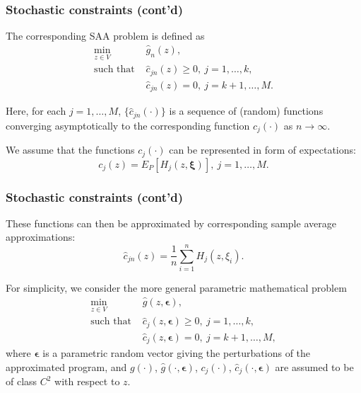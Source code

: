 \documentclass{beamer}
\def\bepsilon{\boldsymbol\epsilon}
\begin{document}
\begin{frame}
\frametitle{Stochastic constraints (cont'd)}

The corresponding SAA problem is defined as
\begin{align*}
\min_{z \in V}\ & \hat{g}_n(z),\\
\text{such that } & \hat{c}_{jn}(z) \geq 0,\ j = 1,\ldots,k,\\
& \hat{c}_{jn}(z) = 0,\ j = k+1,\ldots, M.
\end{align*}

\mbox{}

Here, for each $j = 1,\ldots,M$, $\lbrace \hat{c}_{jn}(\cdot) \rbrace$ is a sequence of (random) functions converging asymptotically to the corresponding function $c_j(\cdot)$ as $n \rightarrow \infty$.

\mbox{}

We assume that the functions $c_j(\cdot)$ can be represented in form of expectations:
\[
c_j(z) = E_P[H_j(z,\boldsymbol{\xi})],\ j = 1,\ldots,M.
\]

\end{frame}

\begin{frame}
\frametitle{Stochastic constraints (cont'd)}

These functions can then be approximated by corresponding sample average approximations:
\[
\hat{c}_{jn}(z) = \frac{1}{n} \sum_{i = 1}^n H_j(z,\xi_i).
\]

\mbox{}

For simplicity, we consider the more general parametric mathematical problem
\begin{align*}
\min_{z \in V}\ & \hat{g}(z, \bepsilon),\\
\text{such that } & \hat{c}_j(z, \bepsilon) \geq 0,\ j
= 1,\ldots,k,\\
& \hat{c}_j(z, \bepsilon) = 0,\ j = k+1,\ldots, M,
\end{align*}
where $\bepsilon$ is a parametric random vector giving the perturbations of the approximated program, and $g(\cdot)$, $\hat{g}(\cdot, \bepsilon)$, $c_j(\cdot)$, $\hat{c}_j(\cdot, \bepsilon)$ are assumed to be of class $C^2$ with respect to $z$.

\end{frame}
\end{document}
